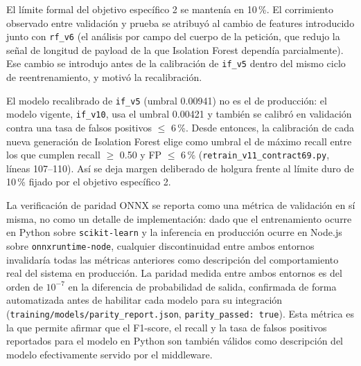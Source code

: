 El límite formal del objetivo específico 2 se mantenía en 10\,\%. El corrimiento observado entre validación y prueba se atribuyó al cambio de features introducido junto con \texttt{rf\_v6} (el análisis por campo del cuerpo de la petición, que redujo la señal de longitud de payload de la que Isolation Forest dependía parcialmente). Ese cambio se introdujo antes de la calibración de \texttt{if\_v5} dentro del mismo ciclo de reentrenamiento, y motivó la recalibración.

El modelo recalibrado de \texttt{if\_v5} (umbral 0.00941) no es el de producción: el modelo vigente, \texttt{if\_v10}, usa el umbral 0.00421 y también se calibró en validación contra una tasa de falsos positivos $\leq$ 6\,\%. Desde entonces, la calibración de cada nueva generación de Isolation Forest elige como umbral el de máximo recall entre los que cumplen recall $\geq$ 0.50 y FP $\leq$ 6\,\% (\texttt{retrain\_v11\_contract69.py}, líneas 107--110). Así se deja margen deliberado de holgura frente al límite duro de 10\,\% fijado por el objetivo específico 2.

La verificación de paridad ONNX se reporta como una métrica de validación en sí misma, no como un detalle de implementación: dado que el entrenamiento ocurre en Python sobre \texttt{scikit-learn} y la inferencia en producción ocurre en Node.js sobre \texttt{onnxruntime-node}, cualquier discontinuidad entre ambos entornos invalidaría todas las métricas anteriores como descripción del comportamiento real del sistema en producción. La paridad medida entre ambos entornos es del orden de $10^{-7}$ en la diferencia de probabilidad de salida, confirmada de forma automatizada antes de habilitar cada modelo para su integración (\texttt{training/models/parity\_report.json}, \texttt{parity\_passed: true}). Esta métrica es la que permite afirmar que el F1-score, el recall y la tasa de falsos positivos reportados para el modelo en Python son también válidos como descripción del modelo efectivamente servido por el middleware.

